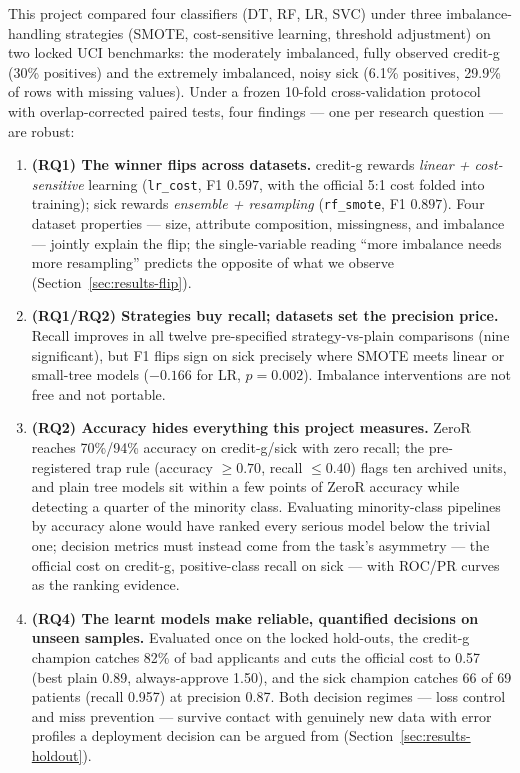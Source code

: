 This project compared four classifiers (DT, RF, LR, SVC) under three imbalance-handling strategies (SMOTE, cost-sensitive learning, threshold adjustment) on two locked UCI benchmarks: the moderately imbalanced, fully observed credit-g (30\% positives) and the extremely imbalanced, noisy sick (6.1\% positives, 29.9\% of rows with missing values). Under a frozen 10-fold cross-validation protocol with overlap-corrected paired tests, four findings --- one per research question --- are robust:

\begin{enumerate}
  \item \textbf{(RQ1) The winner flips across datasets.} credit-g rewards \emph{linear + cost-sensitive} learning (\texttt{lr\_cost}, F1 $0.597$, with the official 5:1 cost folded into training); sick rewards \emph{ensemble + resampling} (\texttt{rf\_smote}, F1 $0.897$). Four dataset properties --- size, attribute composition, missingness, and imbalance --- jointly explain the flip; the single-variable reading ``more imbalance needs more resampling'' predicts the opposite of what we observe (Section~\ref{sec:results-flip}).
  \item \textbf{(RQ1/RQ2) Strategies buy recall; datasets set the precision price.} Recall improves in all twelve pre-specified strategy-vs-plain comparisons (nine significant), but F1 flips sign on sick precisely where SMOTE meets linear or small-tree models ($-0.166$ for LR, $p=0.002$). Imbalance interventions are not free and not portable.
  \item \textbf{(RQ2) Accuracy hides everything this project measures.} ZeroR reaches 70\%/94\% accuracy on credit-g/sick with zero recall; the pre-registered trap rule (accuracy $\geq 0.70$, recall $\leq 0.40$) flags ten archived units, and plain tree models sit within a few points of ZeroR accuracy while detecting a quarter of the minority class. Evaluating minority-class pipelines by accuracy alone would have ranked every serious model below the trivial one; decision metrics must instead come from the task's asymmetry --- the official cost on credit-g, positive-class recall on sick --- with ROC/PR curves as the ranking evidence.
  \item \textbf{(RQ4) The learnt models make reliable, quantified decisions on unseen samples.} Evaluated once on the locked hold-outs, the credit-g champion catches 82\% of bad applicants and cuts the official cost to 0.57 (best plain 0.89, always-approve 1.50), and the sick champion catches 66 of 69 patients (recall 0.957) at precision 0.87. Both decision regimes --- loss control and miss prevention --- survive contact with genuinely new data with error profiles a deployment decision can be argued from (Section~\ref{sec:results-holdout}).
\end{enumerate}

